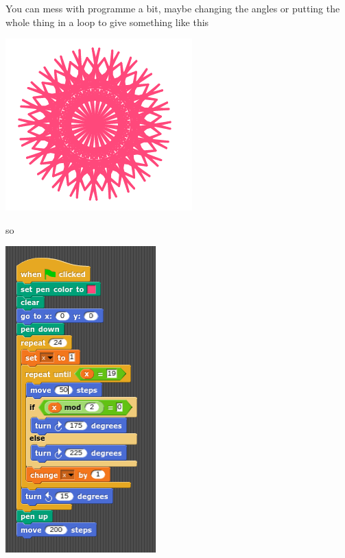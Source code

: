 \documentclass[11pt,a4paper]{scrartcl}
\begin{document}
You can mess with programme a bit, maybe changing the angles or putting the whole thing in a loop to give something like this
\begin{center}
\includegraphics{rotating_star_pic.png}
\end{center}
so
\begin{center}
\includegraphics{rotating_star.png}
\end{center}
\end{document}
